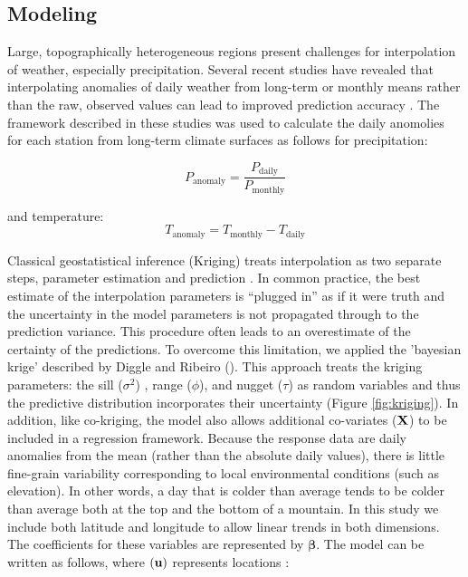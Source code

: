 \documentclass[12pt]{article}
\begin{document}
\subsection{Modeling}
Large, topographically heterogeneous regions present challenges for
interpolation of weather, especially precipitation.  Several recent
studies have revealed that interpolating anomalies of
daily weather from long-term or monthly means rather
than the raw, observed values can lead to improved prediction accuracy
\citep[\textit{e.g. }][]{haylock_european_2008,hunter_climatologically_2005}.
The framework described in these studies was used to calculate the daily
anomolies for each station from long-term climate surfaces as follows for precipitation:

\begin{equation}
P_{\text{anomaly}}=\frac{P_{\text{daily}}}{P_{\text{monthly}}} \label{eq:ppttrans}
\end{equation}

and temperature:
\begin{equation}
T_{\text{anomaly}}=T_{\text{monthly}}-T_{\text{daily}} \label{eq:temptrans}
\end{equation}

Classical geostatistical inference (Kriging) treats interpolation as two
separate steps, parameter estimation and prediction
\citep{diggle_model-based_2007}.  
In common practice, the best estimate of the
interpolation parameters is ``plugged in'' as if it were truth and the
uncertainty in the model parameters is not propagated through to the prediction variance.
This procedure often leads to an overestimate of the certainty of the
predictions.  To overcome this limitation, we applied the 'bayesian
krige' described by Diggle and Ribeiro (\citeyear[][Section 7.2.3]{diggle_model-based_2007}).  
This approach treats the kriging parameters: the sill ($\sigma^2$) ,
range ($\phi$), and nugget ($\tau$) as random variables
and thus the predictive distribution incorporates their
uncertainty (Figure \ref{fig:kriging}). In addition, like co-kriging, the model also allows
additional co-variates (${\bf X}$) to be included in a regression framework.  Because the response data are daily anomalies from the mean (rather than the absolute daily values), there is little fine-grain variability corresponding to local environmental conditions (such as elevation).  In other words, a day that is colder than average tends to be colder than average both at the top and the bottom of a mountain.  In this study we include both latitude and longitude to allow linear trends in both dimensions. The coefficients for these variables are represented by ${\boldsymbol \beta}$.
The model can be written as follows, where $({\bf u})$ represents locations \citep[from][Section 4.5]{ribeiro_jr_bayesian_2009}:
\end{document}

